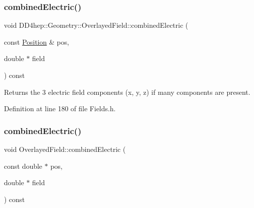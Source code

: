 \hypertarget{class_d_d4hep_1_1_geometry_1_1_overlayed_field_a31f6f56be1e9c668517bd65a5ad941f5}{}\label{class_d_d4hep_1_1_geometry_1_1_overlayed_field_a31f6f56be1e9c668517bd65a5ad941f5} 
\subsubsection{\texorpdfstring{combined\+Electric()}{combinedElectric()}\hspace{0.1cm}{\footnotesize\ttfamily [1/2]}}
{\footnotesize\ttfamily void D\+D4hep\+::\+Geometry\+::\+Overlayed\+Field\+::combined\+Electric (\begin{DoxyParamCaption}\item[{const \hyperlink{namespace_d_d4hep_1_1_geometry_a55083902099d03506c6db01b80404900}{Position} \&}]{pos,  }\item[{double $\ast$}]{field }\end{DoxyParamCaption}) const\hspace{0.3cm}{\ttfamily [inline]}}



Returns the 3 electric field components (x, y, z) if many components are present. 



Definition at line 180 of file Fields.\+h.

\hypertarget{class_d_d4hep_1_1_geometry_1_1_overlayed_field_a84d77cc61091e78a7bddb5f10af2d97b}{}\label{class_d_d4hep_1_1_geometry_1_1_overlayed_field_a84d77cc61091e78a7bddb5f10af2d97b} 
\subsubsection{\texorpdfstring{combined\+Electric()}{combinedElectric()}\hspace{0.1cm}{\footnotesize\ttfamily [2/2]}}
{\footnotesize\ttfamily void Overlayed\+Field\+::combined\+Electric (\begin{DoxyParamCaption}\item[{const double $\ast$}]{pos,  }\item[{double $\ast$}]{field }\end{DoxyParamCaption}) const}



